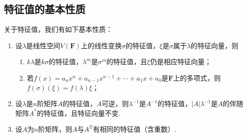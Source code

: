 \subsection{特征值的基本性质}

关于特征值，我们有如下基本性质：
\begin{enumerate}
    \item 设$\lambda$是线性空间$V(\mathbf{F})$上的线性变换$\sigma$的特征值，$\xi$是$\sigma$属于$\lambda$的特征向量，则
          \begin{enumerate}
              \item $k\lambda$是$k\sigma$的特征值，$\lambda^m$是$\sigma^m$的特征值，且$\xi$仍是相应特征向量；

              \item 若$f(x)=a_nx^n+a_{n-1}x^{n-1}+\cdots+a_1x+a_0$是$\mathbf{F}$上的多项式，则$f(\sigma)(\xi)=f(\lambda)\xi$；
          \end{enumerate}

    \item 设$\lambda$是$n$阶矩阵$A$的特征值，$A$可逆，则$\lambda^{-1}$是$A^{-1}$的特征值，$|A|\lambda^{-1}$是$A$的伴随矩阵$A^*$的特征值，且特征向量不变.

    \item 设$A$为$n$阶矩阵，则$A$与$A^\mathrm{T}$有相同的特征值（含重数）.
\end{enumerate}

